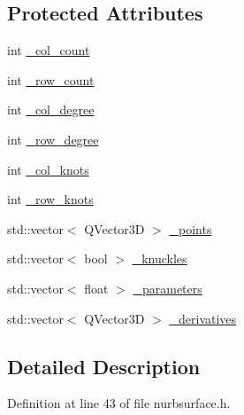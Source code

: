 \subsection*{Protected Attributes}
\begin{DoxyCompactItemize}
\item 
int \hyperlink{classShipCAD_1_1NURBSurface_aac0a2d528cec007b0fb6a154f3a67672}{\-\_\-col\-\_\-count}
\item 
int \hyperlink{classShipCAD_1_1NURBSurface_a251739da98a877b8d68722db5aa59371}{\-\_\-row\-\_\-count}
\item 
int \hyperlink{classShipCAD_1_1NURBSurface_a0192ed41981e4a3525f52be71ceb0e7c}{\-\_\-col\-\_\-degree}
\item 
int \hyperlink{classShipCAD_1_1NURBSurface_a0c53705ad7cc3004e60398f38909f59e}{\-\_\-row\-\_\-degree}
\item 
int \hyperlink{classShipCAD_1_1NURBSurface_a2b0e2649a54a57a9ae6fbeed031b04d0}{\-\_\-col\-\_\-knots}
\item 
int \hyperlink{classShipCAD_1_1NURBSurface_a3799680ea0e67d5d6c1a694f378e70ed}{\-\_\-row\-\_\-knots}
\item 
std\-::vector$<$ Q\-Vector3\-D $>$ \hyperlink{classShipCAD_1_1NURBSurface_a371421f0aec85ad3cffc3dbeeb0b26e4}{\-\_\-points}
\item 
std\-::vector$<$ bool $>$ \hyperlink{classShipCAD_1_1NURBSurface_a6f1765a2698b4ed79f0d110409129c28}{\-\_\-knuckles}
\item 
std\-::vector$<$ float $>$ \hyperlink{classShipCAD_1_1NURBSurface_a6de7536d23d408368f2df4470c1514af}{\-\_\-parameters}
\item 
std\-::vector$<$ Q\-Vector3\-D $>$ \hyperlink{classShipCAD_1_1NURBSurface_a6fa7cce7b1c78fc8fc89be24cba4d9b0}{\-\_\-derivatives}
\end{DoxyCompactItemize}


\subsection{Detailed Description}


Definition at line 43 of file nurbsurface.\-h.



